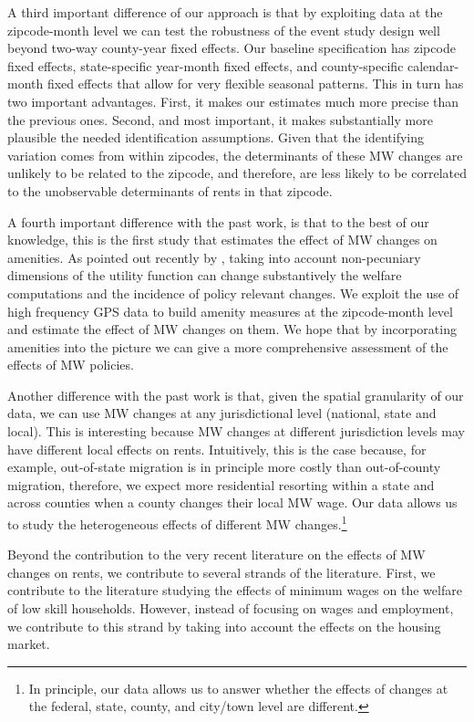 A third important difference of our approach is that by exploiting data at the zipcode-month level we can test the robustness of the event study design well beyond two-way county-year fixed effects. Our baseline specification has zipcode fixed effects, state-specific year-month fixed effects, and county-specific calendar-month fixed effects that allow for very flexible seasonal patterns. This in turn has two important advantages. First, it makes our estimates much more precise than the previous ones. Second, and most important, it makes substantially more plausible the needed identification assumptions. Given that the identifying variation comes from within zipcodes, the determinants of these MW changes are unlikely to be related to the zipcode, and therefore, are less likely to be correlated to the unobservable determinants of rents in that zipcode.

A fourth important difference with the past work, is that to the best of our knowledge, this is the first study that estimates the effect of MW changes on amenities. As pointed out recently by \textcite{diamond2016determinants, almagro2019location}, taking into account non-pecuniary dimensions of the utility function can change substantively the welfare computations and the incidence of policy relevant changes. We exploit the use of high frequency GPS data to build amenity measures at the zipcode-month level and estimate the effect of MW changes on them. We hope that by incorporating amenities into the picture we can give a more comprehensive assessment of the effects of MW policies.

Another difference with the past work is that, given the spatial granularity of our data, we can use MW changes at any jurisdictional level (national, state and local). This is interesting because MW changes at different jurisdiction levels may have different local effects on rents. Intuitively, this is the case because, for example, out-of-state migration is in principle more costly than out-of-county migration, therefore, we expect more residential resorting within a state and across counties when a county changes their local MW wage. Our data allows us to study the heterogeneous effects of different MW changes.\footnote{In principle, our data allows us to answer whether the effects of changes at the federal, state, county, and city/town level are different.} 

Beyond the contribution to the very recent literature on the effects of MW changes on rents, we contribute to several strands of the literature. First, we contribute to the literature studying the effects of minimum wages on the welfare of low skill households. However, instead of focusing on wages and employment\parencite{dinardo1995labor, autor2016contribution, card2000minimum, neumark2006minimum, jardim2017minimum}, we contribute to this strand by taking into account the effects on the housing market.

